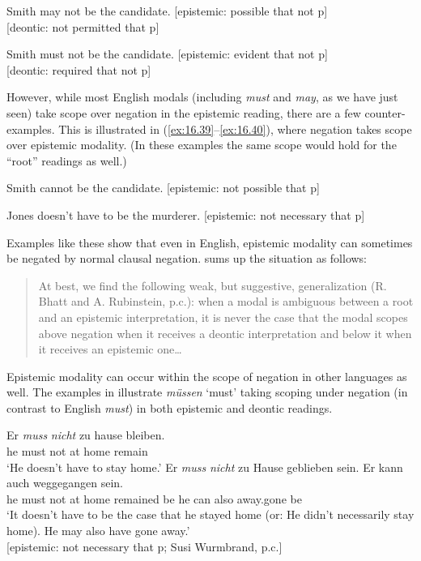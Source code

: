 \ea \label{ex:16.37}
Smith may not be the candidate.  \hfill [epistemic: possible that not p]\\
                                 \hfill [deontic: not permitted that p]
\z

\ea \label{ex:16.38}
Smith must not be the candidate.  \hfill [epistemic: evident that not p]\\
                                  \hfill [deontic: required that not p]
\z


However, while most English modals (including \textit{must} and \textit{may}, as we have just seen) take scope over negation in the epistemic reading, there are a few counter-examples. This is illustrated in (\ref{ex:16.39}--\ref{ex:16.40}), where negation takes scope over epistemic modality. (In these examples the same scope would hold for the “root” readings as well.)


\ea \label{ex:16.39}
Smith cannot be the candidate. \hfill [epistemic: not possible that p]
\z

\ea \label{ex:16.40}
Jones doesn’t have to be the murderer. \hfill [epistemic: not necessary that p]
\z


Examples like these show that even in English, epistemic modality can sometimes be negated by normal clausal negation. \citet[sec. 5.3]{Hacquard2011} sums up the situation as follows:


\begin{quote}
At best, we find the following weak, but suggestive, generalization (R. Bhatt and A. Rubinstein, p.c.): when a modal is ambiguous between a root and an epistemic interpretation, it is never the case that the modal scopes above negation when it receives a deontic interpretation and below it when it receives an epistemic one…
\end{quote}


Epistemic modality can occur within the scope of negation in other languages as well. The examples in  illustrate  \textit{müssen} ‘must’ taking scoping under negation (in contrast to English \textit{must}) in both epistemic and deontic readings.


\ea \label{ex:16.41}
\ea   \gll Er  \textit{muss}  \textit{nicht}  zu  hause  bleiben.\\
he  must  not  at  home  remain\\
\glt ‘He doesn’t have to stay home.’
\ex \gll Er  \textit{muss}  \textit{nicht}  zu  Hause  geblieben  sein.  Er  kann  auch  weggegangen  sein.\\
he  must  not  at  home  remained  be  he  can  also  away.gone  be\\
\glt ‘It doesn’t have to be the case that he stayed home (or: He didn’t necessarily stay home). He may also have gone away.’\\
{}[epistemic: not necessary that p; Susi Wurmbrand, p.c.]
\z \z


